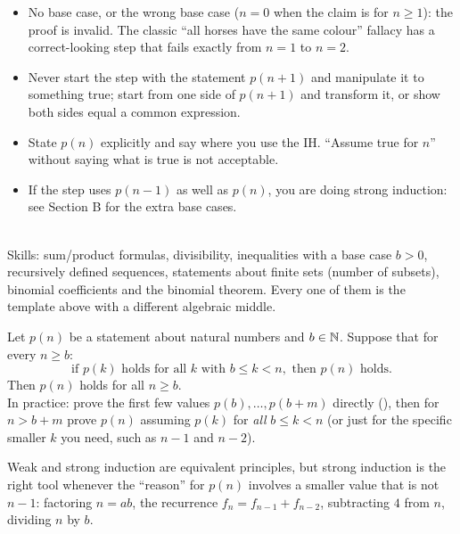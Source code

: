 \begin{warn}
\begin{itemize}
\item No base case, or the wrong base case ($n=0$ when the claim is for $n\ge1$): the proof is invalid. The classic ``all horses have the same colour'' fallacy has a correct-looking step that fails exactly from $n=1$ to $n=2$.
\item Never start the step with the statement $p(n+1)$ and manipulate it to something true; start from one side of $p(n+1)$ and transform it, or show both sides equal a common expression.
\item State $p(n)$ explicitly and say where you use the IH. ``Assume true for $n$'' without saying what is true is not acceptable.
\item If the step uses $p(n-1)$ as well as $p(n)$, you are doing strong induction: see Section B for the extra base cases.
\end{itemize}
\end{warn}

\begin{planning}
\quad {}\\[3pt]
Skills: sum/product formulas, divisibility, inequalities with a base case $b>0$, recursively defined sequences, statements about finite sets (\eg number of subsets), binomial coefficients and the binomial theorem. Every one of them is the template above with a different algebraic middle.
\end{planning}


\begin{result}
Let $p(n)$ be a statement about natural numbers and $b\in\mathbb{N}$. Suppose that for every $n\ge b$:
\[
\text{if } p(k) \text{ holds for all } k \text{ with } b\le k<n, \text{ then } p(n) \text{ holds.}
\]
Then $p(n)$ holds for all $n\ge b$.\\
In practice: prove the first few values $p(b),\dots,p(b+m)$ directly (), then for $n>b+m$ prove $p(n)$ assuming $p(k)$ for \emph{all} $b\le k<n$ (or just for the specific smaller $k$ you need, such as $n-1$ and $n-2$).
\end{result}
Weak and strong induction are equivalent principles, but strong induction is the right tool whenever the ``reason'' for $p(n)$ involves a smaller value that is not $n-1$: factoring $n=ab$, the recurrence $f_{n}=f_{n-1}+f_{n-2}$, subtracting $4$ from $n$, dividing $n$ by $b$.

